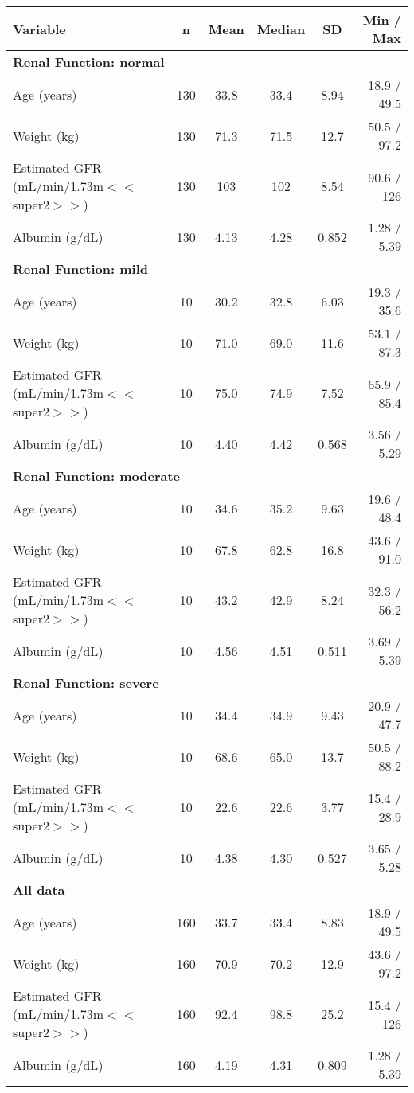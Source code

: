 \setlength{\tabcolsep}{5pt} 
\begin{threeparttable}
\renewcommand{\arraystretch}{1.3}
\begin{tabular}[h]{lccccr}
\hline
Variable & n & Mean & Median & SD & Min / Max \\
\hline
\multicolumn{6}{l}{\textbf{Renal Function: normal}}\\%
Age (years) & 130 & 33.8 & 33.4 & 8.94 & 18.9 / 49.5 \\
Weight (kg) & 130 & 71.3 & 71.5 & 12.7 & 50.5 / 97.2 \\
Estimated GFR (mL/min/1.73m$<$$<$super2$>$$>$) & 130 & 103 & 102 & 8.54 & 90.6 / 126 \\
Albumin (g/dL) & 130 & 4.13 & 4.28 & 0.852 & 1.28 / 5.39 \\
\hline \multicolumn{6}{l}{\textbf{Renal Function: mild}}\\%
Age (years) & 10 & 30.2 & 32.8 & 6.03 & 19.3 / 35.6 \\
Weight (kg) & 10 & 71.0 & 69.0 & 11.6 & 53.1 / 87.3 \\
Estimated GFR (mL/min/1.73m$<$$<$super2$>$$>$) & 10 & 75.0 & 74.9 & 7.52 & 65.9 / 85.4 \\
Albumin (g/dL) & 10 & 4.40 & 4.42 & 0.568 & 3.56 / 5.29 \\
\hline \multicolumn{6}{l}{\textbf{Renal Function: moderate}}\\%
Age (years) & 10 & 34.6 & 35.2 & 9.63 & 19.6 / 48.4 \\
Weight (kg) & 10 & 67.8 & 62.8 & 16.8 & 43.6 / 91.0 \\
Estimated GFR (mL/min/1.73m$<$$<$super2$>$$>$) & 10 & 43.2 & 42.9 & 8.24 & 32.3 / 56.2 \\
Albumin (g/dL) & 10 & 4.56 & 4.51 & 0.511 & 3.69 / 5.39 \\
\hline \multicolumn{6}{l}{\textbf{Renal Function: severe}}\\%
Age (years) & 10 & 34.4 & 34.9 & 9.43 & 20.9 / 47.7 \\
Weight (kg) & 10 & 68.6 & 65.0 & 13.7 & 50.5 / 88.2 \\
Estimated GFR (mL/min/1.73m$<$$<$super2$>$$>$) & 10 & 22.6 & 22.6 & 3.77 & 15.4 / 28.9 \\
Albumin (g/dL) & 10 & 4.38 & 4.30 & 0.527 & 3.65 / 5.28 \\
\hline \multicolumn{6}{l}{\textbf{All data}}\\%
Age (years) & 160 & 33.7 & 33.4 & 8.83 & 18.9 / 49.5 \\
Weight (kg) & 160 & 70.9 & 70.2 & 12.9 & 43.6 / 97.2 \\
Estimated GFR (mL/min/1.73m$<$$<$super2$>$$>$) & 160 & 92.4 & 98.8 & 25.2 & 15.4 / 126 \\
Albumin (g/dL) & 160 & 4.19 & 4.31 & 0.809 & 1.28 / 5.39 \\
\hline
\end{tabular}
\end{threeparttable}
 
